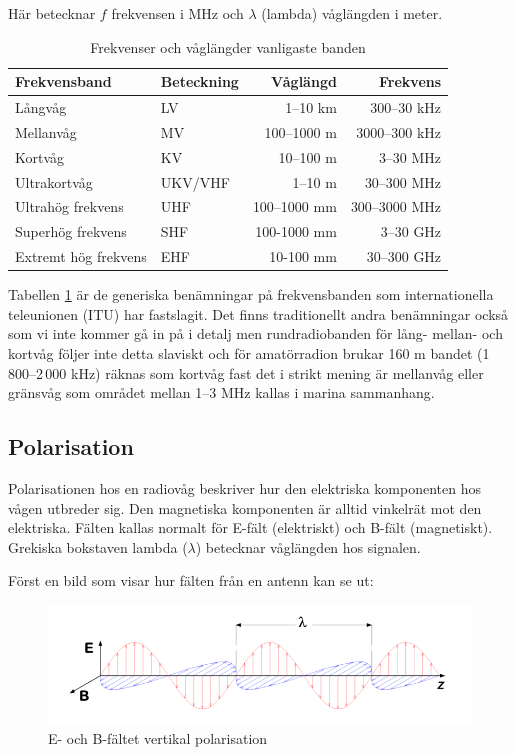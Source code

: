 Här betecknar $f$ frekvensen i MHz och $\lambda$ (lambda) våglängden i meter. 

\begin{table}[!h]
	\begin{tabular}{llrr}
		Frekvensband         & Beteckning &     Våglängd &      Frekvens \\ \hline
		Långvåg              & LV         &     1--10 km &   300--30 kHz \\
		Mellanvåg            & MV         &  100--1000 m & 3000--300 kHz \\
		Kortvåg              & KV         &    10--100 m &     3--30 MHz \\
		Ultrakortvåg         & UKV/VHF    &      1--10 m &   30--300 MHz \\
		Ultrahög frekvens    & UHF        & 100--1000 mm & 300--3000 MHz \\
		Superhög frekvens    & SHF        &  100-1000 mm &     3--30 GHz \\
		Extremt hög frekvens & EHF        &    10-100 mm &   30--300 GHz
	\end{tabular}
	\caption{Frekvenser och våglängder vanligaste banden}
	\label{tab:frekvens-vaglangd}
\end{table}

Tabellen \ref{tab:frekvens-vaglangd} är de generiska benämningar på frekvensbanden som internationella teleunionen (ITU) har fastslagit. Det finns traditionellt andra benämningar också som vi inte kommer gå in på i detalj men rundradiobanden för lång- mellan- och kortvåg följer inte detta slaviskt och för amatörradion brukar 160 m bandet (1\,800--2\,000 kHz) räknas som kortvåg fast det i strikt mening är mellanvåg eller gränsvåg som området mellan 1--3 MHz kallas i marina sammanhang.

\subsection{Polarisation}

Polarisationen hos en radiovåg beskriver hur den elektriska komponenten hos vågen utbreder sig. Den magnetiska komponenten är alltid vinkelrät mot den elektriska. Fälten kallas normalt för E-fält (elektriskt) och B-fält (magnetiskt). Grekiska bokstaven lambda ($\lambda$) betecknar våglängden hos signalen.

Först en bild som visar hur fälten från en antenn kan se ut:

\begin{figure}[h]
	\centering\includegraphics[width=\textwidth]{img/em-wave}
	\caption{E- och B-fältet vertikal polarisation}
\end{figure}

